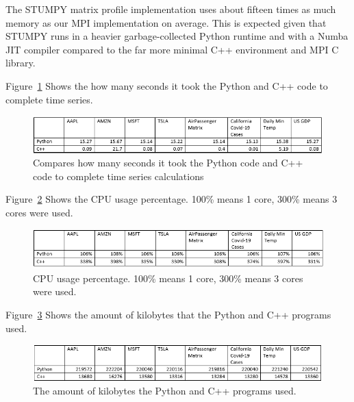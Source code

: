 \documentclass[conference]{IEEEtran}
\begin{document}
The STUMPY matrix profile implementation uses about fifteen times as much memory as our MPI implementation on average.  This is expected given that STUMPY runs in a heavier garbage-collected Python runtime and with a Numba JIT compiler compared to the far more minimal C++ environment and MPI C library.


Figure~\ref{fig:Time_Graph} Shows the how many seconds it took the Python and C++ code to complete time series.

\begin{figure}
\begin{center}
\includegraphics[scale=1.05]{Time.png}
\caption{Compares how many seconds it took the Python code and C++ code to complete time series calculations}
\label{fig:Time_Graph}
\end{center}
\end{figure}

Figure~\ref{fig:CPU_Graph} Shows the CPU usage percentage. 100\% means 1 core, 300\% means 3 cores were used.

\begin{figure}
\begin{center}
\includegraphics[scale=1.05]{CPU.png}
\caption{CPU usage percentage. 100\% means 1 core, 300\% means 3 cores were used.}
\label{fig:CPU_Graph}
\end{center}
\end{figure}

Figure~\ref{fig:Memory_Graph} Shows the amount of kilobytes that the Python and C++ programs used.

\begin{figure}
\begin{center}
\includegraphics[scale=1.05]{Memory.png}
\caption{The amount of kilobytes the Python and C++ programs used.}
\label{fig:Memory_Graph}
\end{center}
\end{figure}
\end{document}
